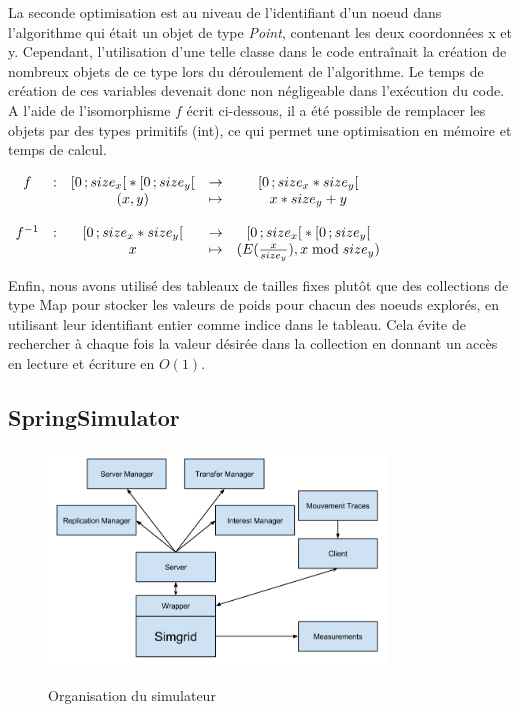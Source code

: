 La seconde optimisation est au niveau de l'identifiant d'un noeud dans l'algorithme qui était un objet de type \textit{Point}, contenant les deux coordonnées x et y.
Cependant, l'utilisation d'une telle classe dans le code entraînait la création de nombreux objets de ce type lors du déroulement de l'algorithme.
Le temps de création de ces variables devenait donc non négligeable dans l'exécution du code.
A l'aide de l'isomorphisme $f$ écrit ci-dessous, il a été possible de remplacer les objets par des types primitifs (int), ce qui permet une optimisation en mémoire et temps de calcul.

\centering
$\begin{array}{ccccc}
f & : & \intervalle{[}{0}{size_{x}}{[}*\intervalle{[}{0}{size_{y}}{[} & \to & \intervalle{[}{0}{size_{x}*size_{y}}{[}\\
  & & \mathopen{(}x,y\mathclose{)} & \mapsto & x*size_{y}+y \\
  & & & \\ %
f^{-1} & : & \intervalle{[}{0}{size_{x}*size_{y}}{[} & \to & \intervalle{[}{0}{size_{x}}{[}*\intervalle{[}{0}{size_{y}}{[} \\
 & & x & \mapsto & \mathopen{(}E\mathopen{(}\frac{x}{size_{y}}\mathclose{)},x\bmod{size_{y}}\mathclose{)} \\
\end{array}$

\justifying
Enfin, nous avons utilisé des tableaux de tailles fixes plutôt que des collections de type Map pour stocker les valeurs de poids pour chacun des noeuds explorés, en utilisant leur identifiant entier comme indice dans le tableau.
Cela évite de rechercher à chaque fois la valeur désirée dans la collection en donnant un accès en lecture et écriture en $O(1)$.

\subsection{SpringSimulator}

\begin{figure}[h!]
	\centering
	\includegraphics[width=0.8\textwidth]{SpringSimulator.png}
	\\[0.2cm]
	\caption{Organisation du simulateur}
	\label{fig:orga_simu}
\end{figure}

